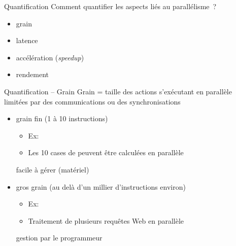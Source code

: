 \begin {frame} {Quantification}
    Comment quantifier les aspects liés au parallélisme~?

    \begin {itemize}
	\item grain
	\item latence
	\item accélération (\emph {speedup\/})
	\item rendement
    \end {itemize}
\end {frame}

\begin {frame} {Quantification -- Grain}
    Grain = taille des actions s'exécutant en parallèle \\
    \implique limitées par des communications ou des synchronisations

    \begin {itemize}
	\item grain fin (1 à 10 instructions)

	    \begin {itemize}
		\item Ex: 
		\item Les 10 cases de  peuvent être calculées en
		    parallèle
	    \end {itemize}
	    \implique facile à gérer (matériel)

	\item gros grain (au delà d'un millier d'instructions environ)

	    \begin {itemize}
		\item Ex: 
		\item Traitement de plusieurs requêtes Web en parallèle
	    \end {itemize}
	    \implique gestion par le programmeur


    \end {itemize}

\end {frame}

